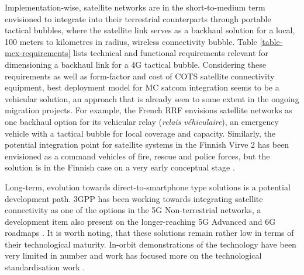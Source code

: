 \documentclass[english, 12pt, a4paper, elec, utf8, a-1b, online]{aaltothesis}
\begin{document}
Implementation-wise, satellite networks are in the short-to-medium term envisioned to integrate into their terrestrial counterparts through portable tactical bubbles, where the satellite link serves as a backhaul solution for a local, 100 meters to kilometres in radius, wireless connectivity bubble.
Table \ref{table-mcx-requirements} lists technical and functional requirements relevant for dimensioning a backhaul link for a 4G tactical bubble.
Considering these requirements as well as form-factor and cost of COTS satellite connectivity equipment, best deployment model for MC satcom integration seems to be a vehicular solution, an approach that is already seen to some extent in the ongoing migration projects.
For example, the French RRF envisions satellite networks as one backhaul option for its vehicular relay (\textit{relais véhiculaire}), an emergency vehicle with a tactical bubble for local coverage and capacity.
Similarly, the potential integration point for satellite systems in the Finnish Virve 2 has been envisioned as a command vehicles of fire, rescue and police forces, but the solution is in the Finnish case on a very early conceptual stage \cite{kokkoniemitarkkanen2024missioncritical,saynevirta2021satellite,dominguez2021resilience}. 

Long-term, evolution towards direct-to-smartphone type solutions is a potential development path. 3GPP has been working towards integrating satellite connectivity as one of the options in the 5G Non-terrestrial networks, a development item also present on the longer-reaching 5G Advanced and 6G roadmaps \cite{ray2021perspective, jiang2021road}. It is worth noting, that these solutions remain rather low in terms of their technological maturity. In-orbit demonstrations of the technology have been very limited in number and work has focused more on the technological standardisation work \cite{sn-2023-09-19-ast, sn-2023-11-07-lynk, 5g-americas-update-on-5g-ntn, jain2023rel18}.
\end{document}
